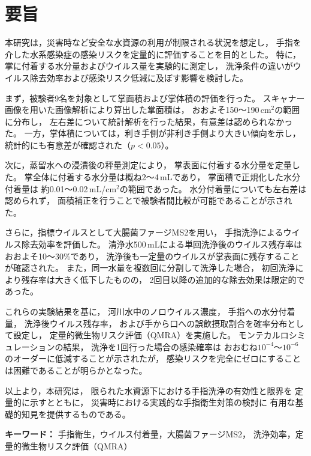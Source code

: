 \chapter*{要旨}

本研究は，災害時など安全な水資源の利用が制限される状況を想定し，
手指を介した水系感染症の感染リスクを定量的に評価することを目的とした。
特に，掌に付着する水分量およびウイルス量を実験的に測定し，
洗浄条件の違いがウイルス除去効率および感染リスク低減に及ぼす影響を検討した。

まず，被験者9名を対象として掌面積および掌体積の評価を行った。
スキャナー画像を用いた画像解析により算出した掌面積は，
おおよそ150～190\,cm$^{2}$の範囲に分布し，
左右差について統計解析を行った結果，有意差は認められなかった。
一方，掌体積については，利き手側が非利き手側より大きい傾向を示し，
統計的にも有意差が確認された（$p<0.05$）。

次に，蒸留水への浸漬後の秤量測定により，
掌表面に付着する水分量を定量した。
掌全体に付着する水分量は概ね2～4\,mLであり，
掌面積で正規化した水分付着量は
約0.01～0.02\,mL/cm$^{2}$の範囲であった。
水分付着量についても左右差は認められず，
面積補正を行うことで被験者間比較が可能であることが示された。

さらに，指標ウイルスとして大腸菌ファージMS2を用い，
手指洗浄によるウイルス除去効率を評価した。
清浄水500\,mLによる単回洗浄後のウイルス残存率は
おおよそ10～30\%であり，
洗浄後も一定量のウイルスが掌表面に残存することが確認された。
また，同一水量を複数回に分割して洗浄した場合，
初回洗浄により残存率は大きく低下したものの，
2回目以降の追加的な除去効果は限定的であった。

これらの実験結果を基に，
河川水中のノロウイルス濃度，
手指への水分付着量，
洗浄後ウイルス残存率，
および手から口への誤飲摂取割合を確率分布として設定し，
定量的微生物リスク評価（QMRA）を実施した。
モンテカルロシミュレーションの結果，
洗浄を1回行った場合の感染確率は
おおむね$10^{-4}$～$10^{-6}$のオーダーに低減することが示されたが，
感染リスクを完全にゼロにすることは困難であることが明らかとなった。

以上より，本研究は，
限られた水資源下における手指洗浄の有効性と限界を
定量的に示すとともに，
災害時における実践的な手指衛生対策の検討に
有用な基礎的知見を提供するものである。

\bigskip
\noindent
\textbf{キーワード：}
手指衛生，ウイルス付着量，大腸菌ファージMS2，
洗浄効率，定量的微生物リスク評価（QMRA）

\newpage

